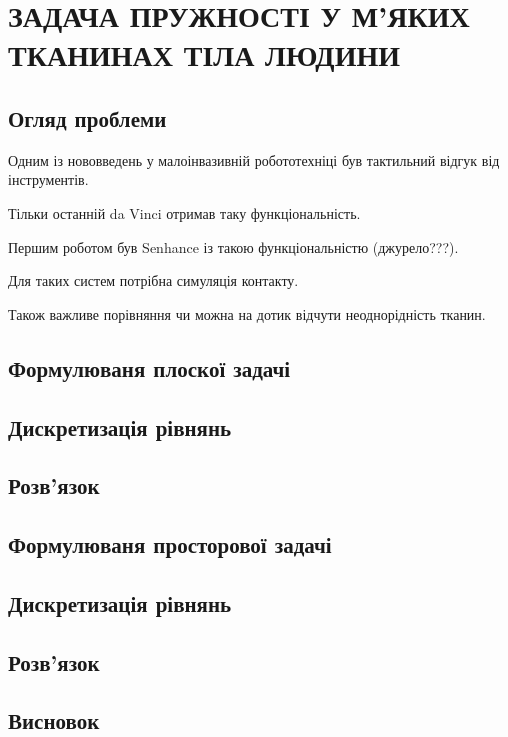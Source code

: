 \chapter{ЗАДАЧА ПРУЖНОСТІ У М'ЯКИХ ТКАНИНАХ ТІЛА ЛЮДИНИ}

\nocite{bahvalov-et-al,benerdge-et-al} 

\section{Огляд проблеми}

Одним із нововведень у малоінвазивній робототехніці був тактильний відгук від інструментів.

Тільки останній da Vinci отримав таку функціональність.

Першим роботом був Senhance із такою функціональністю (джурело???).

Для таких систем потрібна симуляція контакту.

Також важливе порівняння чи можна на дотик відчути неоднорідність тканин.


\section{Формулюваня плоскої задачі}

\section{Дискретизація рівнянь}

\section{Розв'язок}

\section{Формулюваня просторової задачі}

\section{Дискретизація рівнянь}

\section{Розв'язок}

\section{Висновок}
